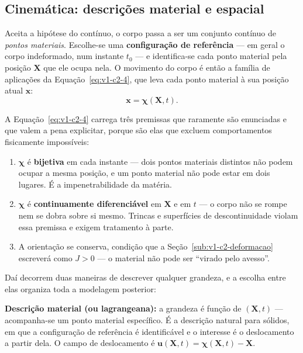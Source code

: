 \documentclass[12pt,a4paper]{article}
\numberwithin{equation}{section}
\numberwithin{table}{section}
\numberwithin{figure}{section}
\begin{document}
\subsection{Cinemática: descrições material e espacial}\label{sub:v1-c2-cinematica}

Aceita a hipótese do contínuo, o corpo passa a ser um conjunto contínuo de
\emph{pontos materiais}. Escolhe-se uma \textbf{configuração de referência} ---
em geral o corpo indeformado, num instante $t_0$ --- e identifica-se cada ponto
material pela posição $\mathbf{X}$ que ele ocupa nela. O movimento do corpo é
então a família de aplicações da Equação~\eqref{eq:v1-c2-4}, que leva cada
ponto material à sua posição atual $\mathbf{x}$:
\begin{equation}\label{eq:v1-c2-4}
\mathbf{x} = \boldsymbol{\chi}(\mathbf{X},t).
\end{equation}

A Equação~\eqref{eq:v1-c2-4} carrega três premissas que raramente são
enunciadas e que valem a pena explicitar, porque são elas que excluem
comportamentos fisicamente impossíveis:

\begin{enumerate}
	\item $\boldsymbol{\chi}$ é \textbf{bijetiva} em cada instante --- dois
	pontos materiais distintos não podem ocupar a mesma posição, e um ponto
	material não pode estar em dois lugares. É a impenetrabilidade da matéria.
	\item $\boldsymbol{\chi}$ é \textbf{continuamente diferenciável} em
	$\mathbf{X}$ e em $t$ --- o corpo não se rompe nem se dobra sobre si mesmo.
	Trincas e superfícies de descontinuidade violam essa premissa e exigem
	tratamento à parte.
	\item A orientação se conserva, condição que a
	Seção~\ref{sub:v1-c2-deformacao} escreverá como $J>0$ --- o material não
	pode ser ``virado pelo avesso''.
\end{enumerate}

Daí decorrem duas maneiras de descrever qualquer grandeza, e a escolha entre
elas organiza toda a modelagem posterior:

\textbf{Descrição material (ou lagrangeana):} a grandeza é função de
$(\mathbf{X},t)$ --- acompanha-se um ponto material específico. É a descrição
natural para sólidos, em que a configuração de referência é identificável e o
interesse é o deslocamento a partir dela. O campo de deslocamento é
$\mathbf{u}(\mathbf{X},t) = \boldsymbol{\chi}(\mathbf{X},t) - \mathbf{X}$.
\end{document}
